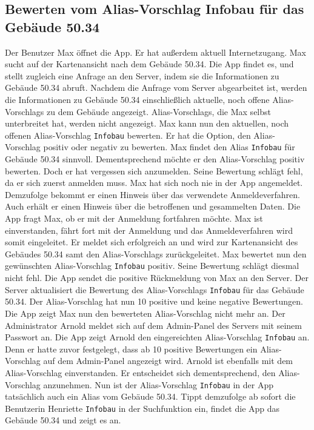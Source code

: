 \subsection{Bewerten vom \Gls{Alias-Vorschlag} Infobau für das Gebäude 50.34}

Der Benutzer Max öffnet die App.
Er hat außerdem aktuell Internetzugang.
Max sucht auf der \Gls{Kartenansicht} nach dem Gebäude 50.34.
Die App findet es, und stellt zugleich eine Anfrage an den \Gls{Server}, indem sie die Informationen zu Gebäude 50.34 abruft.
Nachdem die Anfrage vom \Gls{Server} abgearbeitet ist, werden die Informationen zu Gebäude 50.34 einschließlich aktuelle, noch offene \Glspl{Alias-Vorschlag} zu dem Gebäude angezeigt.
\Glspl{Alias-Vorschlag}, die Max selbst unterbreitet hat, werden nicht angezeigt.
Max kann nun den aktuellen, noch offenen \Gls{Alias-Vorschlag} \texttt{Infobau} bewerten.
Er hat die Option, den \Gls{Alias-Vorschlag} positiv oder negativ zu bewerten.
Max findet den \Gls{Alias} \texttt{Infobau} für Gebäude 50.34 sinnvoll.
Dementsprechend möchte er den \Gls{Alias-Vorschlag} positiv bewerten.
Doch er hat vergessen sich anzumelden.
Seine Bewertung schlägt fehl, da er sich zuerst anmelden muss.
Max hat sich noch nie in der App angemeldet.
Demzufolge bekommt er einen Hinweis über das verwendete Anmeldeverfahren.
Auch erhält er einen Hinweis über die betroffenen und gesammelten Daten.
Die App fragt Max, ob er mit der Anmeldung fortfahren möchte.
Max ist einverstanden, fährt fort mit der Anmeldung und das Anmeldeverfahren wird somit eingeleitet.
Er meldet sich erfolgreich an und wird zur \Gls{Kartenansicht} des Gebäudes 50.34 samt den \Glspl{Alias-Vorschlag} zurückgeleitet.
Max bewertet nun den gewünschten \Gls{Alias-Vorschlag} \texttt{Infobau} positiv.
Seine Bewertung schlägt diesmal nicht fehl.
Die App sendet die positive Rückmeldung von Max an den \Gls{Server}.
Der \Gls{Server} aktualisiert die Bewertung des \Gls{Alias-Vorschlag}s \texttt{Infobau} für das Gebäude 50.34.
Der \Gls{Alias-Vorschlag} hat nun 10 positive und keine negative Bewertungen.
Die App zeigt Max nun den bewerteten \Gls{Alias-Vorschlag} nicht mehr an.
Der Administrator Arnold meldet sich auf dem \Gls{Admin-Panel} des \Gls{Server}s mit seinem Passwort an.
Die App zeigt Arnold den eingereichten \Gls{Alias-Vorschlag} \texttt{Infobau} an.
Denn er hatte zuvor festgelegt, dass ab 10 positive Bewertungen ein \Gls{Alias-Vorschlag} auf dem \Gls{Admin-Panel} angezeigt wird.
Arnold ist ebenfalls mit dem \Gls{Alias-Vorschlag} einverstanden.
Er entscheidet sich dementsprechend, den \Gls{Alias-Vorschlag} anzunehmen.
Nun ist der \Gls{Alias-Vorschlag} \texttt{Infobau} in der App tatsächlich auch ein \Gls{Alias} vom Gebäude 50.34.
Tippt demzufolge ab sofort die Benutzerin Henriette \texttt{Infobau} in der Suchfunktion ein, findet die App das Gebäude 50.34 und zeigt es an.
